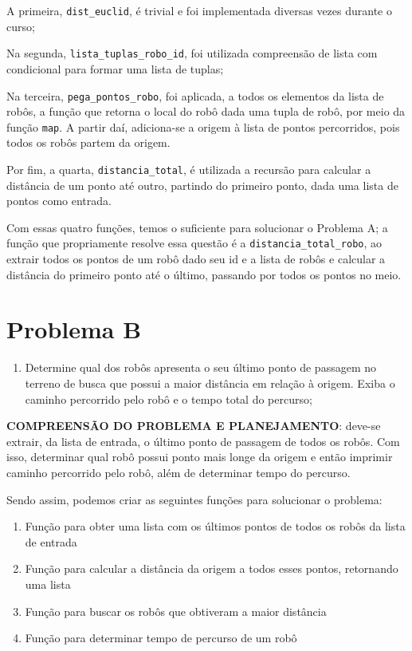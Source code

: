 A primeira, \texttt{dist\_euclid}, é trivial e foi implementada diversas vezes durante o curso;

Na segunda, \texttt{lista\_tuplas\_robo\_id}, foi utilizada compreensão de lista com condicional para formar uma lista de tuplas;

Na terceira, \texttt{pega\_pontos\_robo}, foi aplicada, a todos os elementos da lista de robôs, a função que retorna o local do robô dada uma tupla de robô, por meio da função \texttt{map}. A partir daí, adiciona-se a origem à lista de pontos percorridos, pois todos os robôs partem da origem.

Por fim, a quarta, \texttt{distancia\_total}, é utilizada a recursão para calcular a distância de um ponto até outro, partindo do primeiro ponto, dada uma lista de pontos como entrada.

Com essas quatro funções, temos o suficiente para solucionar o Problema A; a função que propriamente resolve essa questão é a \texttt{distancia\_total\_robo}, ao extrair todos os pontos de um robô dado seu id e a lista de robôs e calcular a distância do primeiro ponto até o último, passando por todos os pontos no meio.


\section{Problema B}\label{problemaB}
\begin{enumerate}[label=\textbf{\alph*)},resume*=problemas]
\item Determine qual dos robôs apresenta o seu último ponto de passagem no terreno de busca que possui a maior distância em relação à origem. Exiba o caminho percorrido pelo robô e o tempo total do percurso;
\end{enumerate}

\noindent \textbf{COMPREENSÃO DO PROBLEMA E PLANEJAMENTO}: deve-se extrair, da lista de entrada, o último ponto de passagem de todos os robôs. Com isso, determinar qual robô possui ponto mais longe da origem e então imprimir caminho percorrido pelo robô, além de determinar tempo do percurso.

Sendo assim, podemos criar as seguintes funções para solucionar o problema:
\begin{enumerate}
    \item Função para obter uma lista com os últimos pontos de todos os robôs da lista de entrada 
    \item Função para calcular a distância da origem a todos esses pontos, retornando uma lista 
    \item Função para buscar os robôs que obtiveram a maior distância
    \item Função para determinar tempo de percurso de um robô
\end{enumerate}

